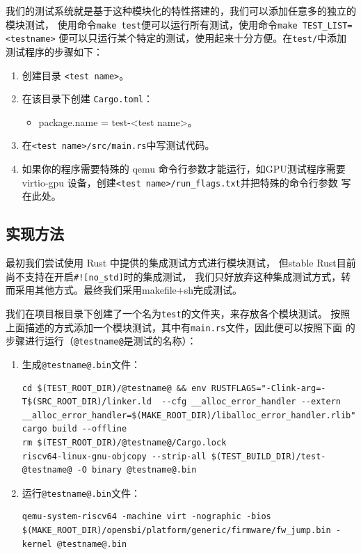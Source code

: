 \documentclass{../runikraft-report}
\begin{document}
我们的测试系统就是基于这种模块化的特性搭建的，我们可以添加任意多的独立的模块测试，
使用命令\texttt{make test}便可以运行所有测试，使用命令\texttt{make TEST\_LIST=<testname>}
便可以只运行某个特定的测试，使用起来十分方便。在\texttt{test/}中添加测试程序的步骤如下：

\begin{enumerate}
\item 创建目录 \texttt{<test name>}。
\item 在该目录下创建 \texttt{Cargo.toml}：
    \begin{itemize}
    \item package.name = test-<test name>。
    \end{itemize}
\item 在\texttt{<test name>/src/main.rs}中写测试代码。
\item 如果你的程序需要特殊的 qemu 命令行参数才能运行，如GPU测试程序需要
    virtio-gpu 设备，创建\texttt{<test name>/run\_flags.txt}并把特殊的命令行参数
    写在此处。
\end{enumerate}

\subsection{实现方法}

最初我们尝试使用 Rust 中提供的集成测试方式进行模块测试\cite{bib:rust-test}，
但stable Rust目前尚不支持在开启\texttt{\#![no\_std]}时的集成测试，
我们只好放弃这种集成测试方式，转而采用其他方式。最终我们采用makefile+sh完成测试。

我们在项目根目录下创建了一个名为\texttt{test}的文件夹，来存放各个模块测试。
按照上面描述的方式添加一个模块测试，其中有\texttt{main.rs}文件，因此便可以按照下面
的步骤进行运行（\texttt{@testname@}是测试的名称）：

\begin{enumerate}
\item 生成\texttt{@testname@.bin}文件：
    \begin{lstlisting}
cd $(TEST_ROOT_DIR)/@testname@ && env RUSTFLAGS="-Clink-arg=-T$(SRC_ROOT_DIR)/linker.ld  --cfg __alloc_error_handler --extern __alloc_error_handler=$(MAKE_ROOT_DIR)/liballoc_error_handler.rlib" cargo build --offline
rm $(TEST_ROOT_DIR)/@testname@/Cargo.lock
riscv64-linux-gnu-objcopy --strip-all $(TEST_BUILD_DIR)/test-@testname@ -O binary @testname@.bin
    \end{lstlisting}
\item 运行\texttt{@testname@.bin}文件：
    \begin{lstlisting}
qemu-system-riscv64 -machine virt -nographic -bios $(MAKE_ROOT_DIR)/opensbi/platform/generic/firmware/fw_jump.bin -kernel @testname@.bin
    \end{lstlisting}
\end{enumerate}
\end{document}
